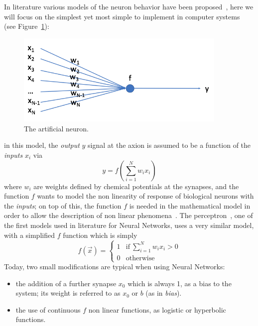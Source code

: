  In literature various models of the neuron behavior have been proposed~\cite{neuronbe1, neuronbe2}, 
 here we will focus on the simplest yet most simple to implement in computer systems~\cite{artificialneuron} (see Figure~\ref{fig:artificialneuron}): %
 \begin{figure}[h]
    \centering
    \hfill
        \includegraphics[width=0.9\textwidth]{images/artificialneuron.png}
     \caption{The artificial neuron.}
     \label{fig:artificialneuron}

\end{figure}
 in this model, the \emph{output} $y$ signal at the axion is assumed to be a function of the \emph{inputs} $x_i$ via
 \begin{equation}
   y = f\left(\sum_{i=1}^{N} w_i x_i\right)
   \label{eq:artificialneuron}
 \end{equation}
where $w_i$ are weights defined by chemical potentials at the synapses, and the function $f$ wants to model the non linearity of response of biological neurons with the \emph{inputs}; on top of this, the function $f$ is needed in the mathematical model in order to allow the description of non linear phenomena~\cite{nonlinearitytheorem}. The perceptron~\cite{perceptron}, one of the first models used in literature for Neural Networks, uses a very similar model, with a simplified $f$ function which is simply
\begin{equation}
  f(\vec{x})= \begin{cases}
                1 &  \text{if}\  \sum_{i=1}^{N} w_i x_i >0 \\
                0 &  \text{otherwise}
              \end{cases}
\end{equation}
Today, two small modifications are typical when using Neural Networks:
\begin{itemize}
\item the addition of a further synapse $x_0$ which is always 1, as a bias to the system; its weight is referred to as $x_0$ or $b$ (as in \emph{bias}).
\item the use of continuous $f$ non linear functions, as  logistic or hyperbolic~\cite{logistic} functions.
\end{itemize}
